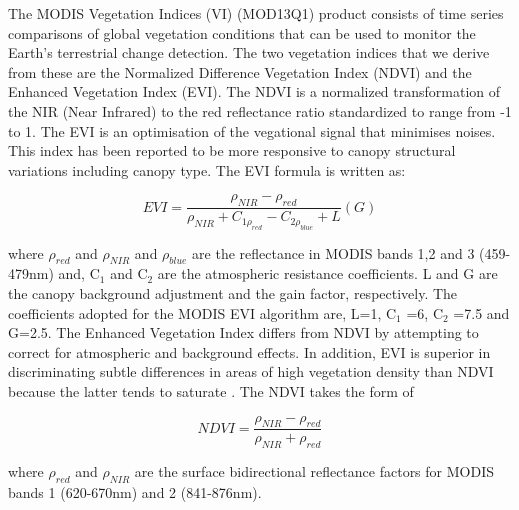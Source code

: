 The MODIS Vegetation Indices (VI) (MOD13Q1) product consists of time series comparisons of global vegetation conditions that can be used to monitor the Earth's terrestrial change detection. The two vegetation indices that we derive from these are the Normalized Difference Vegetation Index (NDVI) and the Enhanced Vegetation Index (EVI). The NDVI is a normalized transformation of the NIR (Near Infrared) to the red reflectance ratio standardized to range from -1 to 1. The EVI is an optimisation of the vegational signal that minimises noises. This index has been reported to be more responsive to canopy structural variations including canopy type. The EVI formula is written as: 


\setlength{\belowdisplayskip}{0pt} \setlength{\belowdisplayshortskip}{0pt}
\setlength{\abovedisplayskip}{0pt} \setlength{\abovedisplayshortskip}{0pt}

\begin{center}
\begin{equation}
EVI = \frac{\rho_{NIR} - \rho_{red}}{\rho_{NIR} + C_{1\rho_{red}} - C_{2\rho_{blue}} + L} (G) \label{eq:2} 
\end{equation}
\end{center}

where $\rho_{red}$ and $\rho_{NIR}$ and $\rho_{blue}$ are the reflectance in MODIS bands 1,2 and 3 (459-479nm) and, C$_{1}$ and C$_{2}$ are the atmospheric resistance coefficients. L and G are the canopy background adjustment and the gain factor, respectively. The coefficients adopted for the MODIS EVI algorithm are, L=1, C$_{1}$ =6, C$_{2}$ =7.5 and G=2.5. The Enhanced Vegetation Index differs from NDVI by attempting to correct for atmospheric and background effects. In addition, EVI is superior in discriminating subtle differences in areas of high vegetation density than NDVI because the latter tends to saturate \citep{didan_munoz_2015, ratana_huete_ferreira_2005}. The NDVI takes the form of


\begin{center}
\begin{equation}
NDVI = \frac{\rho_{NIR} - \rho_{red}}{\rho_{NIR} + \rho_{red}} \label{eq:1} 
\end{equation}
\end{center}

where $\rho_{red}$ and $\rho_{NIR}$ are the surface bidirectional reflectance factors for MODIS bands 1 (620-670nm) and 2 (841-876nm). 


